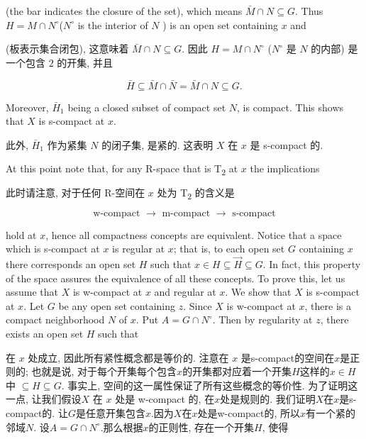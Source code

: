 \documentclass[options]{article}
\begin{document}
\begin{paracol}{2}
	\begin{en}
		(the bar indicates the closure of the set), which means $\bar{M} \cap N \subseteq G$. Thus $H=M \cap N^{\circ}$($N^{\circ}$ is the interior of $N$ ) is an open set containing $x$ and

	\end{en}
	\begin{cn}
		(板表示集合闭包), 这意味着 $\bar{M} \cap N \subseteq G$. 因此 $H=M \cap N^{\circ}$ ($N^{\circ}$ 是 $N$ 的内部) 是一个包含 $2$ 的开集, 并且
	\end{cn}
\end{paracol}
\[
		\bar{H} \subseteq \bar{M} \cap \bar{N}=\bar{M} \cap N \subseteq G .
\]
\begin{paracol}{2}

	\begin{en}
		Moreover, $\bar{H}_1$ being a closed subset of compact set $N$, is compact. This shows
		that $X$ is s-compact at $x$.
	\end{en}
	\begin{cn}
		此外, $\bar{H}_1$ 作为紧集 $N$ 的闭子集, 是紧的. 这表明	$X$ 在 $x$ 是 s-compact 的.
	\end{cn}
	\begin{en}
		At this point note that, for any R-space
		that is T\textsubscript{\!$2$} at $x$ the implications
	\end{en}
	\begin{cn}
		此时请注意, 对于任何 R-空间在 $x$ 处为 T\textsubscript{\!$2$} 的含义是
	\end{cn}
\end{paracol}
\[
		\text { w-compact } \longrightarrow \text { m-compact } \longrightarrow \text { s-compact }
\]
\begin{paracol}{2}
	\begin{en}
		\noindent
		hold at $x$, hence all compactness concepts are equivalent. Notice that a space which is
		s-compact at $x$ is regular at $x$; that is, to each open set $G$ containing $x$ there
		corresponds an open set $H$ such that $x \in H\subseteq \overrightarrow{H}\subseteq G$.
		In fact, this property of the space assures the equivalence of all these concepts. To
		prove this, let us assume that $X$ is w-compact at $x$ and regular at $x$. We show that
		$X$ is s-compact at $x$. Let $G$ be any open set containing $z$. Since $X$ is w-compact
		at $x$, there is a compact neighborhood $N$ of $x$. Put $A=G \cap N^{\circ}$. Then by
		regularity at $z$, there exists an open set $H$ such that
	\end{en}
	\begin{cn}
		\noindent
		在 $x$ 处成立, 因此所有紧性概念都是等价的. 注意在 $x$ 是s-compact的空间在$x$是正则的; 也就是说, 对于每个开集每个包含$x$的开集都对应着一个开集$H$这样的$x \in H$中 $\subseteq	H \subseteq G$. 事实上, 空间的这一属性保证了所有这些概念的等价性. 为了证明这一点, 让我们假设$X$ 在 $x$ 处是 w-compact 的, 在$x$处是规则的. 我们证明$X$在$x$是s-compact的. 让$G$是任意开集包含$x$.因为$X$在$x$处是w-compact的, 所以$x$有一个紧的邻域$N$. 设$A=G\cap N^{\circ}$.那么根据$x$的正则性, 存在一个开集$H$, 使得
	\end{cn}
\end{paracol}
\end{document}
